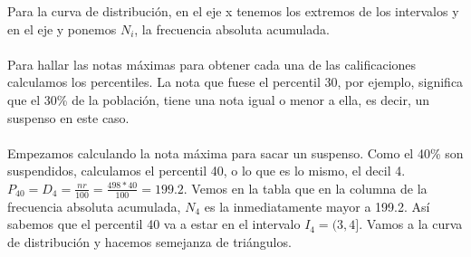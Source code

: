     \begin{center}
    \end{center} 
    Para la curva de distribución, en el eje x tenemos los extremos de los intervalos y en el eje y ponemos $N_i$, la frecuencia absoluta acumulada. \\ \\
    Para hallar las notas máximas para obtener cada una de las calificaciones calculamos los percentiles. La nota que fuese el percentil 30, por ejemplo, significa que el 30\% de la población, tiene una nota igual o menor a ella, es decir, un suspenso en este caso. \\ \\ 
    Empezamos calculando la nota máxima para sacar un suspenso. Como el 40\% son suspendidos, calculamos el percentil 40, o lo que es lo mismo, el decil 4. $P_{40} = D_{4} = \frac{nr}{100} = \frac{498*40}{100} = 199.2$. Vemos en la tabla que en la columna de la frecuencia absoluta acumulada, $N_4$ es la inmediatamente mayor a 199.2. Así sabemos que el percentil 40 va a estar en el intervalo $I_4 = (3,4]$. Vamos a la curva de distribución y hacemos semejanza de triángulos. \\
    
